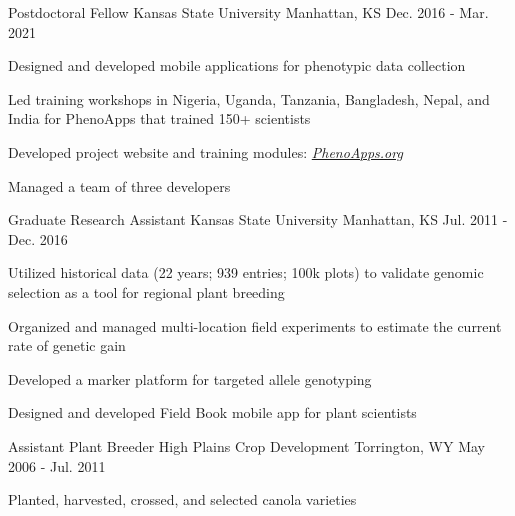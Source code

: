 
\begin{cventries}

  \cventry
    {Postdoctoral Fellow} %
    {Kansas State University} %
    {Manhattan, KS} %
    {Dec. 2016 - Mar. 2021} %
    {
      \begin{cvitems} %
        \item {Designed and developed mobile applications for phenotypic data collection}
        \item {Led training workshops in Nigeria, Uganda, Tanzania, Bangladesh, Nepal, and India for PhenoApps that trained 150+ scientists}
        \item {Developed project website and training modules: \href{www.PhenoApps.org}{\textit{PhenoApps.org}}}
        \item {Managed a team of three developers}
      \end{cvitems}
    }

  \cventry
    {Graduate Research Assistant} %
    {Kansas State University} %
    {Manhattan, KS} %
    {Jul. 2011 - Dec. 2016} %
    {
      \begin{cvitems} %
        \item {Utilized historical data (22 years; 939 entries; 100k plots) to validate genomic selection as a  tool for regional plant breeding}
        \item {Organized and managed multi-location field experiments to estimate the current rate of genetic gain}
        \item {Developed a marker platform for targeted allele genotyping}
        \item {Designed and developed Field Book mobile app for plant scientists}
      \end{cvitems}
    }

  \cventry
    {Assistant Plant Breeder} %
    {High Plains Crop Development} %
    {Torrington, WY} %
    {May 2006 - Jul. 2011} %
    {
      \begin{cvitems} %
        \item {Planted, harvested, crossed, and selected canola varieties}
      \end{cvitems}
    }


\end{cventries}
